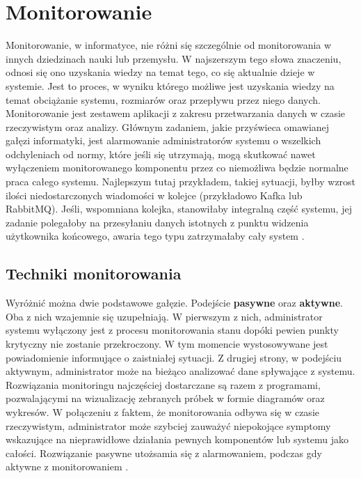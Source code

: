 \section{Monitorowanie}
    Monitorowanie, w informatyce, nie różni się szczególnie od monitorowania w innych dziedzinach nauki lub przemysłu. 
    W najszerszym tego słowa znaczeniu, odnosi się ono uzyskania wiedzy na temat tego, co się aktualnie dzieje w systemie.
    Jest to proces, w wyniku którego możliwe jest uzyskania wiedzy na temat obciążanie systemu, rozmiarów oraz przepływu przez niego
    danych. Monitorowanie jest zestawem aplikacji z zakresu przetwarzania danych w czasie rzeczywistym oraz analizy. 
    Głównym zadaniem, jakie przyświeca omawianej gałęzi informatyki, jest alarmowanie administratorów systemu o wszelkich
    odchyleniach od normy, które jeśli się utrzymają, mogą skutkować nawet wyłączeniem monitorowanego
    komponentu przez co niemożliwa będzie normalne praca całego systemu. Najlepszym tutaj przykładem, takiej sytuacji, 
    byłby wzrost ilości niedostarczonych wiadomości w kolejce (przykładowo Kafka lub RabbitMQ). Jeśli, wspomniana kolejka,
    stanowiłaby integralną część systemu, jej zadanie polegałoby na przesyłaniu danych istotnych z punktu
    widzenia użytkownika końcowego, awaria tego typu zatrzymałaby cały system \cite{monitoring_and_alerting}.
    
\subsection{Techniki monitorowania}
    Wyróżnić można dwie podstawowe gałęzie. Podejście \textbf{pasywne} oraz \textbf{aktywne}. Oba z nich wzajemnie się uzupełniają.
    W pierwszym z nich, administrator systemu wyłączony jest z procesu monitorowania stanu dopóki pewien
    punkty krytyczny nie zostanie przekroczony. W tym momencie wystosowywane jest powiadomienie informujące o zaistniałej
    sytuacji. Z drugiej strony, w podejściu aktywnym, administrator może na bieżąco analizować dane spływające z systemu.
    Rozwiązania monitoringu najczęściej dostarczane są razem z programami, pozwalającymi na
    wizualizację zebranych próbek w formie diagramów oraz wykresów. W połączeniu z faktem, że monitorowania odbywa się
    w czasie rzeczywistym, administrator może szybciej zauważyć niepokojące symptomy wskazujące
    na nieprawidłowe działania pewnych komponentów lub systemu jako całości.
    Rozwiązanie pasywne utożsamia się z alarmowaniem, podczas gdy aktywne z monitorowaniem \cite{monitoring_and_alerting}.
    
